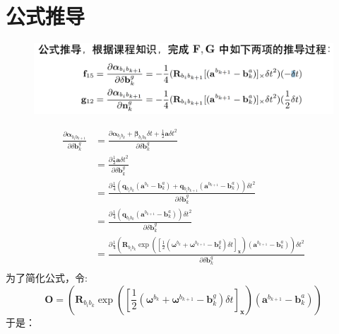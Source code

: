 \documentclass[oneside]{article}
\begin{document}
\section{公式推导}
\begin{figure}[htbp]
    \centering
    \includegraphics[width=.8\linewidth]{figures/fig3.png}    
\end{figure}
\begin{align}
    \frac{\partial \boldsymbol{\alpha}_{b_{i} b_{k+1}}}{\partial \delta \mathbf{b}_{k}^{g}}    
 &= \frac{\partial\boldsymbol{\alpha}_{b_{i} b_{k}}+\boldsymbol{\beta}_{b_{i} b_{k}} \delta t+\frac{1}{2} \mathbf{a} \delta t^{2}}{\partial \delta \mathbf{b}_{k}^{g}} \\
 &= \frac{\partial\frac{1}{2} \mathbf{a} \delta t^{2}}{\partial \delta \mathbf{b}_{k}^{g}} \\
 &= \frac{\partial\frac{1}{4}\left(\mathbf{q}_{b_{i} b_{k}}\left({\mathbf{a}}^{b_{k}}-\mathbf{b}_{k}^{a}\right)+\mathbf{q}_{b_{i} b_{k+1}}\left({\mathbf{a}}^{b_{k+1}}-\mathbf{b}_{k}^{a}\right)\right) \delta t^2}{\partial \delta \mathbf{b}_{k}^{g}} \\
 &= \frac{\partial\frac{1}{4}\left(\mathbf{q}_{b_{i} b_{k}}\left({\mathbf{a}}^{b_{k+1}}-\mathbf{b}_{k}^{a}\right)\right) \delta t^2}{\partial \delta \mathbf{b}_{k}^{g}} \\
 &= \frac{\partial\frac{1}{4}\left(\mathbf{R}_{b_{i} b_{k}}
\exp \left( \left[ \frac{1}{2}(\mathbf{\omega}^{b_k} + \mathbf{\omega}^{b_{k + 1}} - \mathbf{b}_k^g) \delta t \right]_{\mathbf{x}} \right)
 \left({\mathbf{a}}^{b_{k+1}}-\mathbf{b}_{k}^{a}\right)\right) \delta t^2}{\partial \delta \mathbf{b}_{k}^{g}} \\
\end{align} 
为了简化公式，令:
\begin{equation}
    \mathbf{O} = \left(\mathbf{R}_{b_{i} b_{k}}
    \exp \left( \left[ \frac{1}{2}(\mathbf{\omega}^{b_k} + \mathbf{\omega}^{b_{k + 1}} - \mathbf{b}_k^g) \delta t \right]_{\mathbf{x}} \right)
     \left({\mathbf{a}}^{b_{k+1}}-\mathbf{b}_{k}^{a}\right)\right)  
\end{equation}
于是：
\end{document}
